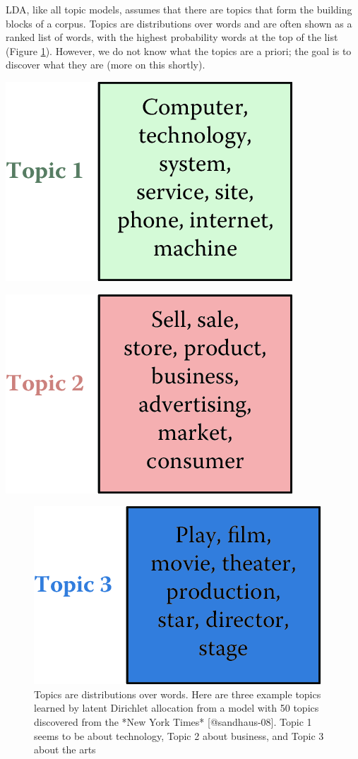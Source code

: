 \documentclass[]{krantz}
\begin{document}
LDA, like all topic models, assumes that there are topics that form the
building blocks of a corpus. Topics are distributions over words and are
often shown as a ranked list of words, with the highest probability
words at the top of the list (Figure \ref{fig:nyt-topics-3}). However,
we do not know what the topics are {a priori}; the goal is to discover
what they are (more on this shortly).

\begin{center}\includegraphics[width=0.7\linewidth]{ChapterText/figures/nyt_topics-1} \end{center}

\begin{center}\includegraphics[width=0.7\linewidth]{ChapterText/figures/nyt_topics-2} \end{center}\begin{figure}

{\centering \includegraphics[width=0.7\linewidth]{ChapterText/figures/nyt_topics-3} 

}

\caption{Topics are distributions over words. Here are three example topics learned by latent Dirichlet allocation from a model with 50 topics discovered from the *New York Times* [@sandhaus-08]. Topic 1 seems to be about technology, Topic 2 about business, and Topic 3 about the arts}\label{fig:nyt-topics-3}
\end{figure}
\end{document}
